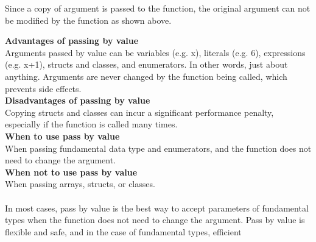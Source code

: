 \documentclass[11pt,fleqn]{book} %
\begin{document}
\begin{tcolorbox}[width=\textwidth,colback={white},title={KEYNOTE},colbacktitle=purple!50!white,coltitle=black]  
  Since a copy of argument is passed to the function, the original argument can not be modified by the function as shown above.
\end{tcolorbox}
\hfil \break
\textbf{Advantages of passing by value}\\
Arguments passed by value can be variables (e.g. x), literals (e.g. 6), expressions (e.g. x+1), structs and classes, and enumerators. In other words, just about anything.
Arguments are never changed by the function being called, which prevents side effects.\\
\textbf{Disadvantages of passing by value} \\
Copying structs and classes can incur a significant performance penalty, especially if the function is called many times.\\
\textbf{When to use pass by value}\\
When passing fundamental data type and enumerators, and the function does not need to change the argument.\\
\textbf{When not to use pass by value}\\
When passing arrays, structs, or classes.\\ \\
In most cases, pass by value is the best way to accept parameters of fundamental types when the function does not need to change the argument. Pass by value is flexible and safe, and in the case of fundamental types, efficient
\end{document}
